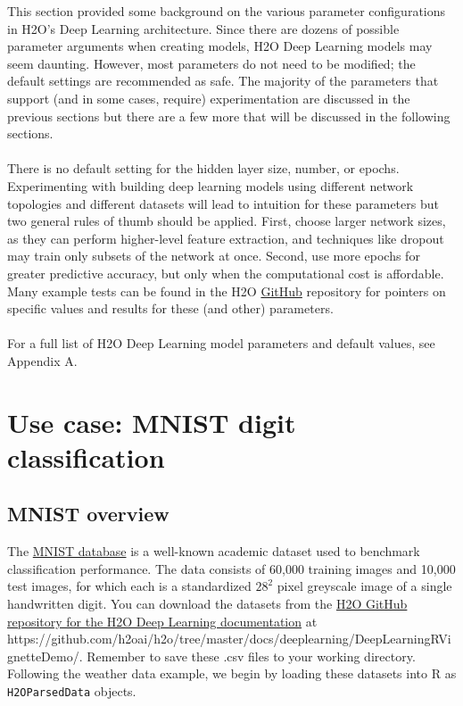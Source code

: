 \documentclass{article}[11pt]
\begin{document}
This section provided some background on the various parameter configurations in H2O's Deep Learning architecture. Since there are dozens of possible parameter arguments when creating models, H2O Deep Learning models may seem daunting. However, most parameters do not need to be modified; the default settings are recommended as safe. The majority of the parameters that support (and in some cases, require) experimentation are discussed in the previous sections but there are a few more that will be discussed in the following sections. 
\\
\\
There is no default setting for the hidden layer size, number, or epochs. Experimenting with building deep learning models using different network topologies and different datasets will lead to intuition for these parameters but two general rules of thumb should be applied. First, choose larger network sizes, as they can perform higher-level feature extraction, and techniques like dropout may train only subsets of the network at once. Second, use more epochs for greater predictive accuracy, but only when the computational cost is affordable. Many example tests can be found in the H2O \href{https://github.com/h2oai/h2o/}{GitHub} repository for pointers on specific values and results for these (and other) parameters.
\\
\\
For a full list of H2O Deep Learning model parameters and default values, see Appendix A. 

\section{Use case: MNIST digit classification} 


\subsection{MNIST overview} 

The \href{http://yann.lecun.com/exdb/mnist/}{MNIST database} is a well-known academic dataset used to benchmark classification performance. The data consists of 60,000 training images and 10,000 test images, for which each is a standardized $28^2$ pixel greyscale image of a single handwritten digit. You can download the datasets from the \href{https://github.com/h2oai/h2o/tree/master/docs/deeplearning/DeepLearningRVignetteDemo}{H2O GitHub repository for the H2O Deep Learning documentation} at \\https://github.com/h2oai/h2o/tree/master/docs/deeplearning/DeepLearningRVignetteDemo/. Remember to save these .csv files to your working directory. Following the weather data example, we begin by loading these datasets into R as \texttt{H2OParsedData} objects. 
\end{document}
